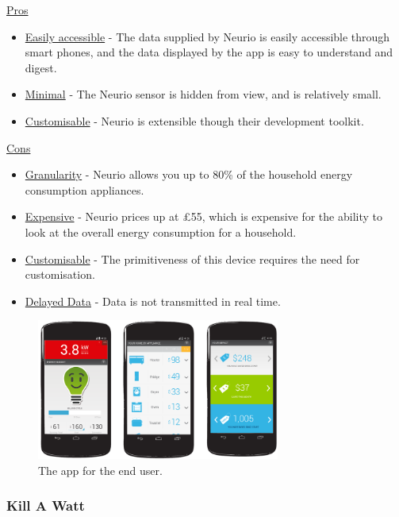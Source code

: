 \documentclass[draft,preprint,12pt,3p]{elsarticle}
\begin{document}
\begin{center}
    \underline{Pros}
    \begin{itemize}

      \item \underline{Easily accessible} - The data supplied by Neurio is easily accessible through smart phones, and the data displayed by the app is easy to understand and digest.
      \item \underline{Minimal} - The Neurio sensor is hidden from view, and is relatively small.
      \item \underline{Customisable} - Neurio is extensible though their development toolkit.
    \end{itemize}
    
    \underline{Cons}
    
    \begin{itemize}
      \item \underline{Granularity} - Neurio allows you up to 80\% of the household energy consumption appliances.
      \item \underline{Expensive} - Neurio prices up at \pounds55, which is expensive for the ability to look at the overall energy consumption for a household. 
      \item \underline{Customisable} - The primitiveness of this device requires the need for customisation.
      \item \underline{Delayed Data} - Data is not transmitted in real time.
    \end{itemize}
    
\end{center}

\begin{figure}[H]
    \centering
    \includegraphics[width=8cm]{existing/neurio-app}
    \caption {The app for the end user.}
\end{figure}


\subsubsection{Kill A Watt}
\end{document}
